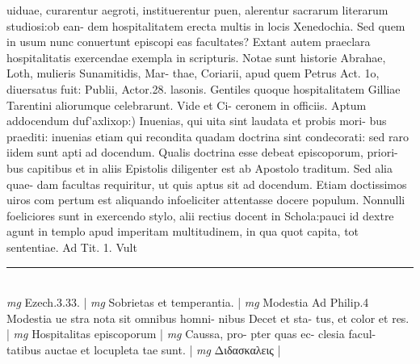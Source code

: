 \documentclass{article}
\begin{document}
\begin{pages}
uiduae, curarentur aegroti, instituerentur puen, alerentur sacrarum literarum studiosi:ob ean- dem hospitalitatem erecta multis in locis Xenedochia. Sed quem in usum nunc conuertunt episcopi eas facultates? Extant autem praeclara hospitalitatis exercendae exempla in scripturis. Notae sunt historie Abrahae, Loth, mulieris Sunamitidis, Mar- thae, Coriarii, apud quem Petrus Act. 1o, diuersatus fuit: Publii, Actor.28. lasonis. Gentiles quoque hospitalitatem Gilliae Tarentini aliorumque celebrarunt. Vide et Ci- ceronem in officiis.  \pend\pstart Aptum addocendum duf'axlixop:) Inuenias, qui uita sint laudata et probis mori- bus praediti: inuenias etiam qui recondita quadam doctrina sint condecorati: sed raro iidem sunt apti ad docendum. Qualis doctrina esse debeat episcoporum, priori- bus capitibus et in aliis Epistolis diligenter est ab Apostolo traditum. Sed alia quae- dam facultas requiritur, ut quis aptus sit ad docendum. Etiam doctissimos uiros com pertum est aliquando infoeliciter attentasse docere populum. Nonnulli foeliciores sunt in exercendo stylo, alii rectius docent in Schola:pauci id dextre agunt in templo apud imperitam multitudinem, in qua quot capita, tot sententiae. Ad Tit. 1. Vult  \pend
\vspace{0.5cm}\noindent
\vspace{0.2cm}\rule{1cm}{0.2pt}\\ 
\hspace{0.2cm}\textit{mg}
\footnotesize Ezech.3.33. 
\normalsize| 
\hspace{0.2cm}\textit{mg}
\footnotesize Sobrietas et temperantia. 
\normalsize| 
\hspace{0.2cm}\textit{mg}
\footnotesize Modestia Ad Philip.4 Modestia ue stra nota sit omnibus homni- nibus Decet et sta- tus, et color et res. 
\normalsize| 
\hspace{0.2cm}\textit{mg}
\footnotesize Hospitalitas episcoporum 
\normalsize| 
\hspace{0.2cm}\textit{mg}
\footnotesize Caussa, pro- pter quas ec- clesia facul- tatibus auctae et locupleta tae sunt. 
\normalsize| 
\hspace{0.2cm}\textit{mg}
\footnotesize Διδασκαλεις 
\normalsize| 

\end{pages}
\end{document}
